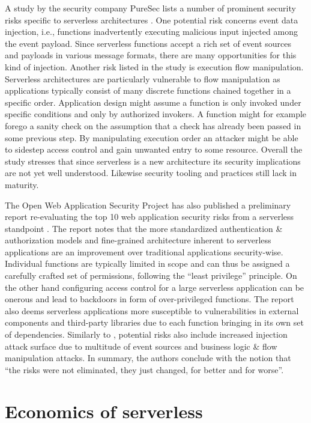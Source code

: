A study by the security company PureSec lists a number of prominent security risks specific to serverless architectures \parencite{segal18risks}. One potential risk concerns event data injection, i.e., functions inadvertently executing malicious input injected among the event payload. Since serverless functions accept a rich set of event sources and payloads in various message formats, there are many opportunities for this kind of injection. Another risk listed in the study is execution flow manipulation. Serverless architectures are particularly vulnerable to flow manipulation as applications typically consist of many discrete functions chained together in a specific order. Application design might assume a function is only invoked under specific conditions and only by authorized invokers. A function might for example forego a sanity check on the assumption that a check has already been passed in some previous step. By manipulating execution order an attacker might be able to sidestep access control and gain unwanted entry to some resource. Overall the study stresses that since serverless is a new architecture its security implications are not yet well understood. Likewise security tooling and practices still lack in maturity.

The Open Web Application Security Project has also published a preliminary report re-evaluating the top 10 web application security risks from a serverless standpoint \parencite{owasp18top10}. The report notes that the more standardized authentication \& authorization models and fine-grained architecture inherent to serverless applications are an improvement over traditional applications security-wise. Individual functions are typically limited in scope and can thus be assigned a carefully crafted set of permissions, following the ``least privilege'' principle. On the other hand configuring access control for a large serverless application can be onerous and lead to backdoors in form of over-privileged functions. The report also deems serverless applications more susceptible to vulnerabilities in external components and third-party libraries due to each function bringing in its own set of dependencies. Similarly to \textcite{segal18risks}, potential risks also include increased injection attack surface due to multitude of event sources and business logic \& flow manipulation attacks. In summary, the authors conclude with the notion that ``the risks were not eliminated, they just changed, for better and for worse''.

\section{Economics of serverless} \label{sec:economics}

